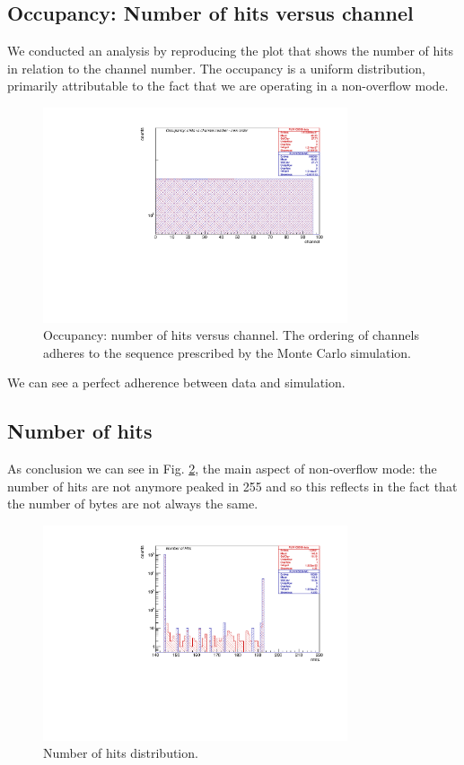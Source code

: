 \subsection{Occupancy: Number of hits versus channel}
We conducted an analysis by reproducing the plot that shows the number of hits in relation to the channel number. The occupancy is a uniform distribution, primarily attributable to the fact that we are operating in a non-overflow mode.
\begin{figure}[!h]
\centering
\includegraphics[width =0.8\textwidth]{figures/pdf/figure_00002_nhitsvschannel_roc_simulation_2}
\caption{Occupancy: number of hits versus channel. The ordering of channels adheres to the sequence prescribed by the Monte Carlo simulation.}
\label{fig:5}
\end{figure}
We can see a perfect adherence between data and simulation.
\subsection{Number of hits}
As conclusion we can see in Fig. \ref{fig:6}, the main aspect of non-overflow mode: the number of hits are not anymore peaked in 255 and so this reflects in the fact that the number of bytes are not always the same.
\begin{figure}[!h]
\centering
\includegraphics[width =0.8\textwidth]{figures/pdf/figure_00009_nhits_105038}
\caption{Number of hits distribution.}
\label{fig:6}
\end{figure}










